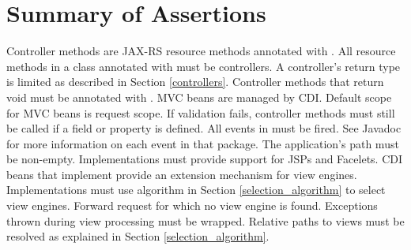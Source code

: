 \chapter{Summary of Assertions}
\label{assertions}

\begin{description}
 Controller methods are JAX-RS resource methods annotated with .
 All resource methods in a class annotated with  must
be controllers.
 A controller's return type is limited as described in Section 
\ref{controllers}.
 Controller methods that return void must be annotated with .
 MVC beans are managed by CDI.
 Default scope for MVC beans is request scope.
 If validation fails, controller methods must still be called if a 
 field or property is defined. 
 All events in  must be fired. See Javadoc for more
information on each event in that package.
 The application's path must be non-empty.
 Implementations must provide support for JSPs and Facelets.
 CDI beans that implement  provide
an extension mechanism for view engines.
 Implementations must use algorithm in Section \ref{selection_algorithm} 
to select view engines.
 Forward request for which no view engine is found.
 Exceptions thrown during view processing must be wrapped.
 Relative paths to views must be resolved as explained in 
Section \ref{selection_algorithm}.
\end{description}
